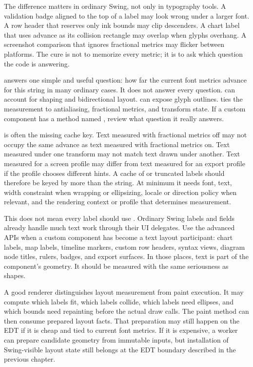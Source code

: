 The difference matters in ordinary Swing, not only in typography tools. A validation badge aligned to the top of a label may look wrong under a larger font. A row header that reserves only ink bounds may clip descenders. A chart label that uses advance as its collision rectangle may overlap when glyphs overhang. A screenshot comparison that ignores fractional metrics may flicker between platforms. The cure is not to memorize every metric; it is to ask which question the code is answering.

 answers one simple and useful question: how far the current font metrics advance for this string in many ordinary cases. It does not answer every question.  can account for shaping and bidirectional layout.  can expose glyph outlines.  ties the measurement to antialiasing, fractional metrics, and transform state. If a custom component has a method named , review what question it really answers.

 is often the missing cache key. Text measured with fractional metrics off may not occupy the same advance as text measured with fractional metrics on. Text measured under one transform may not match text drawn under another. Text measured for a screen profile may differ from text measured for an export profile if the profile chooses different hints. A cache of  or truncated labels should therefore be keyed by more than the string. At minimum it needs font, text, width constraint when wrapping or ellipsizing, locale or direction policy when relevant, and the rendering context or profile that determines measurement.

This does not mean every label should use . Ordinary Swing labels and fields already handle much text work through their UI delegates. Use the advanced APIs when a custom component has become a text layout participant: chart labels, map labels, timeline markers, custom row headers, syntax views, diagram node titles, rulers, badges, and export surfaces. In those places, text is part of the component's geometry. It should be measured with the same seriousness as shapes.

A good renderer distinguishes layout measurement from paint execution. It may compute which labels fit, which labels collide, which labels need ellipses, and which bounds need repainting before the actual draw calls. The paint method can then consume prepared layout facts. That preparation may still happen on the EDT if it is cheap and tied to current font metrics. If it is expensive, a worker can prepare candidate geometry from immutable inputs, but installation of Swing-visible layout state still belongs at the EDT boundary described in the previous chapter.

